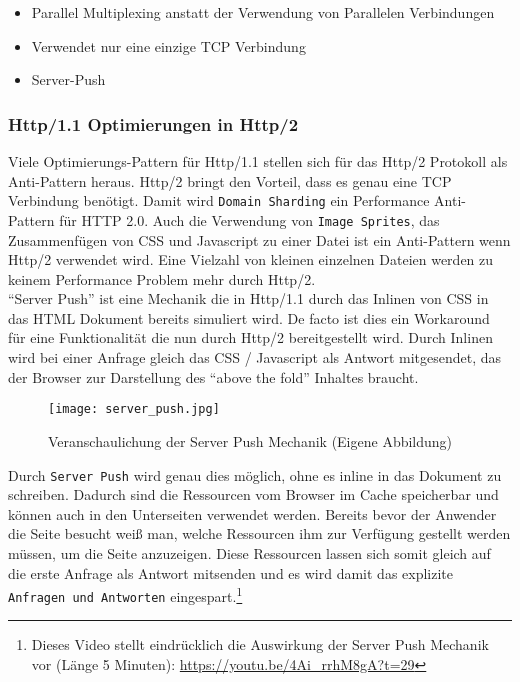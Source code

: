 		\begin{itemize}
			\item Parallel Multiplexing anstatt der Verwendung von Parallelen Verbindungen
			\item Verwendet nur eine einzige TCP Verbindung
			\item Server-Push
		\end{itemize}
		
		\subsubsection{Http/1.1 Optimierungen in Http/2} %
		\label{ssub:http_1_1_optimierungen_in_http_2}
			Viele Optimierungs-Pattern für Http/1.1 stellen sich für das Http/2 Protokoll als Anti-Pattern heraus. Http/2 bringt den Vorteil, dass es genau eine TCP Verbindung benötigt. Damit wird \texttt{Domain Sharding} ein Performance Anti-Pattern für HTTP 2.0. Auch die Verwendung von \texttt{Image Sprites}, das Zusammenfügen von CSS und Javascript zu einer Datei ist ein Anti-Pattern wenn Http/2 verwendet wird. Eine Vielzahl von kleinen einzelnen Dateien werden zu keinem Performance Problem mehr durch Http/2.\autocite{grigorikHttp2}\\
			"`Server Push"' ist eine Mechanik die in Http/1.1 durch das Inlinen von CSS in das HTML Dokument bereits simuliert wird. De facto ist dies ein Workaround für eine Funktionalität die nun durch Http/2 bereitgestellt wird. Durch Inlinen wird bei einer Anfrage gleich das CSS / Javascript als Antwort mitgesendet, das der Browser zur Darstellung des "`above the fold"' Inhaltes braucht.

			\begin{figure}[htbp]
				\begin{center}
					\texttt{[image: server\_push.jpg]}
					\caption{Veranschaulichung der Server Push Mechanik (Eigene Abbildung)}
					\label{fig:server_push}
				\end{center}
			\end{figure}
			
			Durch \texttt{Server Push} wird genau dies möglich, ohne es inline in das Dokument zu schreiben. Dadurch sind die Ressourcen vom Browser im Cache speicherbar und können auch in den Unterseiten verwendet werden. Bereits bevor der Anwender die Seite besucht weiß man, welche Ressourcen ihm zur Verfügung gestellt werden müssen, um die Seite anzuzeigen. Diese Ressourcen lassen sich somit gleich auf die erste Anfrage als Antwort mitsenden und es wird damit das explizite \texttt{Anfragen und Antworten} eingespart.\footnote{Dieses Video stellt eindrücklich die Auswirkung der Server Push Mechanik vor (Länge 5 Minuten): \url{https://youtu.be/4Ai_rrhM8gA?t=29}}\\

